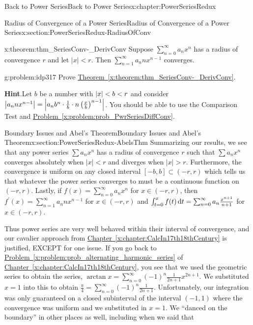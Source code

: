 \begin{chapterptx}{Back to Power Series}{}{Back to Power Series}{}{}{x:chapter:PowerSeriesRedux}
\begin{sectionptx}{Radius of Convergence of a Power Series}{}{Radius of Convergence of a Power Series}{}{}{x:section:PowerSeriesRedux-RadiusOfConv}
\begin{theorem}{}{}{x:theorem:thm_SeriesConv-_DerivConv}
			 Suppose \(\sum_{n=0}^\infty a_nx^n\) has a radius of convergence \(r\) and let \(|x|\lt r\). Then \(\sum_{n=1}^\infty a_nnx^{n-1}\) converges.%
		\end{theorem}
		\begin{problem}{}{g:problem:idp317}%
			Prove \hyperref[x:theorem:thm_SeriesConv-_DerivConv]{Theorem~{\xreffont\ref{x:theorem:thm_SeriesConv-_DerivConv}}}.%
			\par\smallskip%
			\noindent\textbf{\blocktitlefont Hint}.\hypertarget{g:hint:idp318}{}\quad{}Let \(b\) be a number with \(\left|x\right|< b< r\) and consider \(\left|a_nnx^{n-1}\right| =\left|a_nb^n\cdot\frac{1}{b}\cdot
				n\left(\frac{x}{b}\right)^{n-1}\right|\).  You should be able to use the Comparison Test and \hyperref[x:problem:prob_PwrSeriesDiffConv]{Problem~{\xreffont\ref{x:problem:prob_PwrSeriesDiffConv}}}.%
		\end{problem}
	\end{sectionptx}
	\typeout{************************************************}
	\typeout{************************************************}
	\begin{sectionptx}{Boundary Issues and Abel's Theorem}{}{Boundary Issues and Abel's Theorem}{}{}{x:section:PowerSeriesRedux-AbelsThm}
		Summarizing our results, we see that any power series \(\sum a_nx^n\) has a radius of convergence \(r\) such that \(\sum a_nx^n\) converges absolutely when \(|x|\lt r\) and diverges when \(|x|>r\). Furthermore, the convergence is uniform on any closed interval \([-b,b]\subset(-r,r)\) which tells us that whatever the power series converges to must be a continuous function on \((-r,r)\). Lastly, if \(f(x)=\sum_{n=0}^\infty a_nx^n\) for \(x\in(-r,r)\), then \(f^\prime(x)=\sum_{n=1}^\infty a_nnx^{n-1}\) for \(x\in(-r,r)\) and \(\int_{t=0}^xf(t)\,{\rm d} t = \sum_{n=0}^\infty a_n\frac{x^{n+1}}{n+1}\) for \(x\in(-r,r)\).%
		\par
		Thus power series are very well behaved within their interval of convergence, and our cavalier approach from \hyperref[x:chapter:CalcIn17th18thCentury]{Chapter~{\xreffont\ref{x:chapter:CalcIn17th18thCentury}}} is justified, \alert{EXCEPT} for one issue. If you go back to \hyperref[x:problem:prob_alternating_harmonic_series]{Problem~{\xreffont\ref{x:problem:prob_alternating_harmonic_series}}} of \hyperref[x:chapter:CalcIn17th18thCentury]{Chapter~{\xreffont\ref{x:chapter:CalcIn17th18thCentury}}}, you see that we used the geometric series to obtain the series, \(\arctan x =\sum_{n=0}^\infty(-1)^n\frac{1}{2n+1}x^{2n+1}\). We substituted \(x=1\) into this to obtain \(\frac{\pi}{4}=\sum_{n=0}^\infty(-1)^n\frac{1}{2n+1}\). Unfortunately, our integration was only guaranteed on a closed subinterval of the interval \((-1,1)\) where the convergence was uniform and we substituted in \(x=1\). We ``danced on the boundary'' in other places as well, including when we said that%

\end{sectionptx}
\end{chapterptx}
